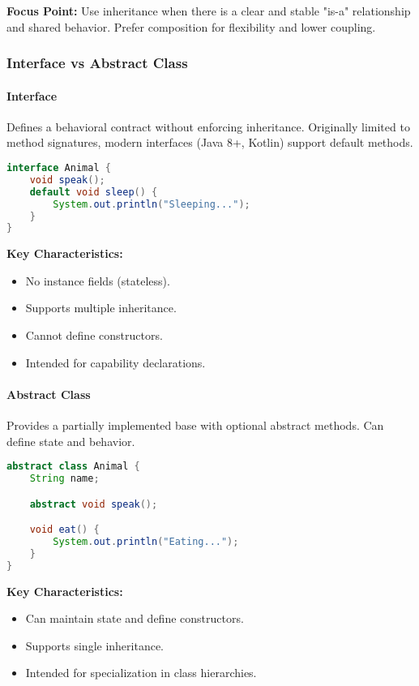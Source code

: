 \documentclass[a4paper,12pt]{article}
\begin{document}
\textbf{Focus Point:} Use inheritance when there is a clear and stable "is-a" relationship and shared behavior. Prefer composition for flexibility and lower coupling.

\subsubsection{Interface vs Abstract Class}

\paragraph{Interface}
Defines a behavioral contract without enforcing inheritance. Originally limited to method signatures, modern interfaces (Java 8+, Kotlin) support default methods.

\begin{lstlisting}[language=Java]
interface Animal {
    void speak();
    default void sleep() {
        System.out.println("Sleeping...");
    }
}
\end{lstlisting}

\textbf{Key Characteristics:}
\begin{itemize}
  \item No instance fields (stateless).
  \item Supports multiple inheritance.
  \item Cannot define constructors.
  \item Intended for capability declarations.
\end{itemize}

\paragraph{Abstract Class}
Provides a partially implemented base with optional abstract methods. Can define state and behavior.

\begin{lstlisting}[language=Java]
abstract class Animal {
    String name;

    abstract void speak();

    void eat() {
        System.out.println("Eating...");
    }
}
\end{lstlisting}

\textbf{Key Characteristics:}
\begin{itemize}
  \item Can maintain state and define constructors.
  \item Supports single inheritance.
  \item Intended for specialization in class hierarchies.
\end{itemize}
\end{document}

